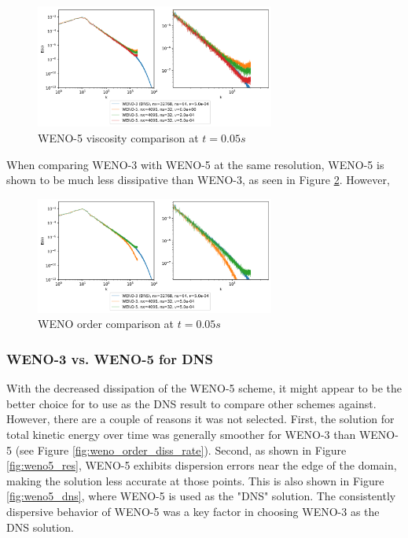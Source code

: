 \documentclass[conf]{new-aiaa}
\begin{document}
\begin{figure}[hbt!]
	\centering
	\includegraphics[width=0.7\textwidth]{figures/WENO5_Viscosity_Comparison_Ek_vs_k.png}
	\caption{WENO-5 viscosity comparison at $t=0.05s$}
	\label{fig:weno5_vis}
\end{figure}

When comparing WENO-3 with WENO-5 at the same resolution, WENO-5 is shown to be
much less dissipative than WENO-3, as seen in Figure \ref{fig:weno_order}.
However, 

\begin{figure}[hbt!]
	\centering
	\includegraphics[width=0.7\textwidth]{figures/WENO_Order_Comparison_Ek_vs_k.png}
	\caption{WENO order comparison at $t=0.05s$}
	\label{fig:weno_order}
\end{figure}

\subsubsection{WENO-3 vs. WENO-5 for DNS} \label{sec:dns_type}
With the decreased dissipation of the WENO-5 scheme, it might appear to be the
better choice for to use as the DNS result to compare other schemes against.
However, there are a couple of reasons it was not selected. First, the solution
for total kinetic energy over time was generally smoother for WENO-3 than
WENO-5 (see Figure \ref{fig:weno_order_diss_rate}). Second, as shown in Figure
\ref{fig:weno5_res}, WENO-5 exhibits dispersion errors near the edge of the
domain, making the solution less accurate at those points. This is also shown
in Figure \ref{fig:weno5_dns}, where WENO-5 is used as the "DNS" solution. The
consistently dispersive behavior of WENO-5 was a key factor in choosing WENO-3
as the DNS solution.
\end{document}
